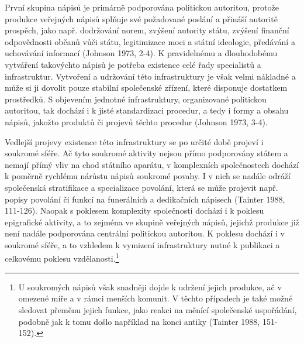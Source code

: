 První skupina nápisů je primárně podporována politickou autoritou, protože produkce veřejných nápisů splňuje své požadované poslání a přináší autoritě prospěch, jako např. dodržování norem, zvýšení autority státu, zvýšení finanční odpovědnosti občanů vůči státu, legitimizace moci a státní ideologie, předávání a uchovávání informací (Johnson 1973, 2-4). K pravidelnému a dlouhodobému vytváření takovýchto nápisů je potřeba existence celé řady specialistů a infrastruktur. Vytvoření a udržování této infrastruktury je však velmi nákladné a může si ji dovolit pouze stabilní společenské zřízení, které disponuje dostatkem prostředků. S objevením jednotné infrastruktury, organizované politickou autoritou, tak dochází i k jisté standardizaci procedur, a tedy i formy a obsahu nápisů, jakožto produktů či projevů těchto procedur (Johnson 1973, 3-4).

Vedlejší projevy existence této infrastruktury se po určité době projeví i soukromé sféře. Ač tyto soukromé aktivity nejsou přímo podporovány státem a nemají přímý vliv na chod státního aparátu, v komplexních společnostech dochází k poměrně rychlému nárůstu nápisů soukromé povahy. I v nich se nadále odráží společenská stratifikace a specializace povolání, která se může projevit např. popisy povolání či funkcí na funerálních a dedikačních nápisech (Tainter 1988, 111-126). Naopak s poklesem komplexity společnosti dochází i k poklesu epigrafické aktivity, a to zejména ve skupině veřejných nápisů, jejichž produkce již není nadále podporována centrální politickou autoritou. K poklesu dochází i v soukromé sféře, a to vzhledem k vymizení infrastruktury nutné k publikaci a celkovému poklesu vzdělanosti.\footnote{U soukromých nápisů však snadněji dojde k udržení jejich produkce, ač v omezené míře a v rámci menších komunit. V těchto případech je také možné sledovat přeměnu jejich funkce, jako reakci na měnící společenské uspořádání, podobně jak k tomu došlo například na konci antiky (Tainter 1988, 151-152).}

